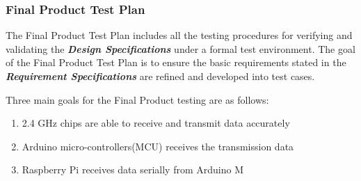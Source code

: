 \pagebreak
\subsubsection{Final Product Test Plan}

The Final Product Test Plan includes all the testing procedures for verifying and validating the \textbf{\textit{Design Specifications}} under a formal
 test environment. The goal of the Final Product Test Plan is to ensure the basic requirements stated in the \textbf{\textit{Requirement Specifications}}
 are refined and developed into test cases.

\medskip
Three main goals for the Final Product testing are as follows:

\begin{enumerate}
    \item 2.4 GHz chips are able to receive and transmit data accurately
    \item Arduino micro-controllers(MCU) receives the transmission data 
    \item Raspberry Pi receives data serially from Arduino M
\end{enumerate}


